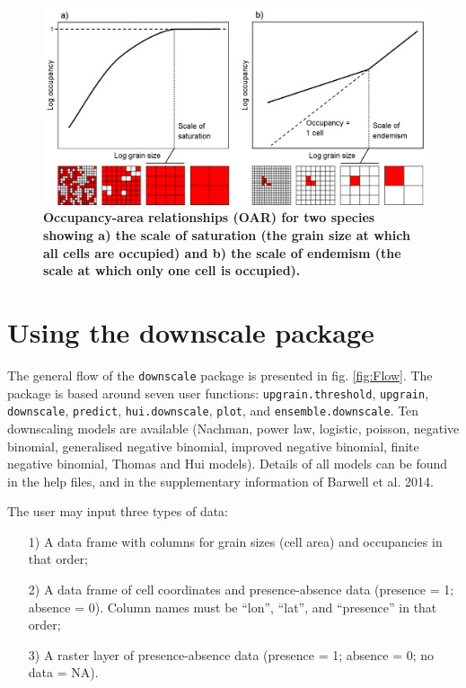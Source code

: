 \documentclass{article}[12pt, a4paper]
\begin{document}
\begin{figure}[!h]
\centering
\includegraphics[width=12.5cm]{Saturation.png}
\caption{\textbf{Occupancy-area relationships (OAR) for two species showing a) the scale of saturation (the grain size at which all cells are occupied) and b) the scale of endemism (the scale at which only one cell is occupied).}}
\label{fig:Saturation}
\end{figure}

\newpage
\section{Using the downscale package}

The general flow of the \texttt{downscale} package is presented in fig. \ref{fig:Flow}. The package is based around seven user functions:  \texttt{upgrain.threshold}, \texttt{upgrain}, \texttt{downscale}, \texttt{predict}, \texttt{hui.downscale}, \texttt{plot}, and \texttt{ensemble.downscale}. Ten downscaling models are available (Nachman, power law, logistic, poisson, negative binomial, generalised negative binomial, improved negative binomial, finite negative binomial, Thomas and Hui models). Details of all models can be found in the help files, and in the supplementary information of Barwell et al. 2014. 

The user may input three types of data:
\begin{enumerate} \itemsep1pt \parskip0pt 
\item [1)] A data frame with columns for grain sizes (cell area) and occupancies in that order;
\item [2)] A data frame of cell coordinates and presence-absence data (presence = 1; absence = 0). Column names must be ``lon”, ``lat”, and ``presence” in that order;
\item [3)] A raster layer of presence-absence data (presence = 1; absence = 0; no data = NA).
\end{enumerate}
\end{document}
